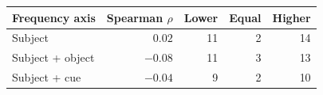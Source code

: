 \begin{tabular}{lrrrr}
\toprule
Frequency axis & Spearman $\rho$ & Lower & Equal & Higher \\
\midrule
Subject & $0.02$ & 11 & 2 & 14 \\
Subject + object & $-0.08$ & 11 & 3 & 13 \\
Subject + cue & $-0.04$ & 9 & 2 & 10 \\
\bottomrule
\end{tabular}
